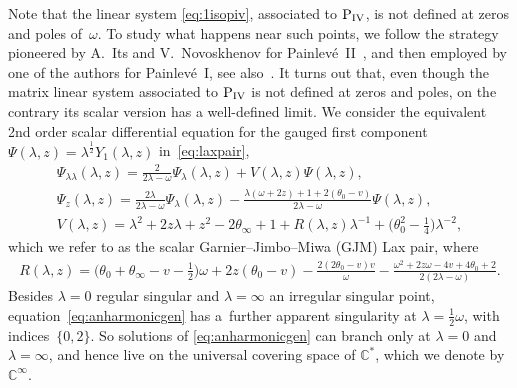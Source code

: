 \documentclass[pdftex]{sigma}
\numberwithin{equation}{section}
\newcommand{\om}{\omega}
\begin{document}
Note that the linear system \eqref{eq:1isopiv}, associated to ${\rm P}_{\rm IV}$, is not def\/ined at zeros and poles of~$\om$.
To study what happens near such points, we follow the strategy pioneered by A.~Its and V.~Novoskhenov for Painlev\'e~II~\cite{its86},
and then employed by one of the authors \cite{myphd,piwkb} for Painlev\'e~I, see also~\cite{chudnovsky90}.
It turns out that, even though the matrix linear system associated to ${\rm P}_{\rm IV}$ is not def\/ined at zeros and poles, on the contrary its scalar version has a well-def\/ined limit. We consider the equivalent 2nd order scalar dif\/ferential equation for the gauged f\/irst component
$\Psi(\lambda,z)=\lambda^{\frac{1}{2}}Y_1(\lambda,z)$ in~\eqref{eq:laxpair},
\begin{subequations}
	\label{eq:scalarlaxpair}
\begin{gather}
\Psi_{\lambda\lambda}(\lambda,z) = \frac{2}{2\lambda-\om}\Psi_{\lambda}(\lambda,z)+V(\lambda,z)\Psi(\lambda,z), \label{eq:anharmonicgen}\\
\Psi_{z}(\lambda,z) = \frac{2\lambda}{2\lambda-\om}\Psi_{\lambda}(\lambda,z)-\frac{\lambda(\om+2z)+1+2(\theta_0-v)}{2\lambda-\om}\Psi(\lambda,z),\label{eq:deform}\\
V(\lambda,z)=\lambda^2+2z\lambda+z^2-2\theta_\infty+1+R(\lambda,z)\lambda^{-1}+\big(\theta_0^2-\tfrac{1}{4}\big)\lambda^{-2} ,\nonumber
\end{gather}
\end{subequations}
which we refer to as the scalar Garnier--Jimbo--Miwa (GJM) Lax pair, where
\begin{gather*}
R(\lambda,z)=\big(\theta_0+\theta_\infty-v-\tfrac{1}{2}\big)\om+2z(\theta_0-v)-\frac{2(2\theta_0-v)v}{\om}-\frac{\om^2+2z\om-4v+4\theta_0+2}{2(2\lambda-\om)}.
\end{gather*}
Besides $\lambda=0$ regular singular and $\lambda=\infty$ an irregular singular point, equation~\eqref{eq:anharmonicgen} has a~further apparent singularity at $\lambda=\tfrac{1}{2}\om$, with indices~$\{0,2\}$. So solutions of \eqref{eq:anharmonicgen} can branch only at $\lambda=0$ and $\lambda=\infty$, and hence live on the universal covering space of $\mathbb{C}^*$, which we denote by $\mathbb{C}^\infty$.
\end{document}
